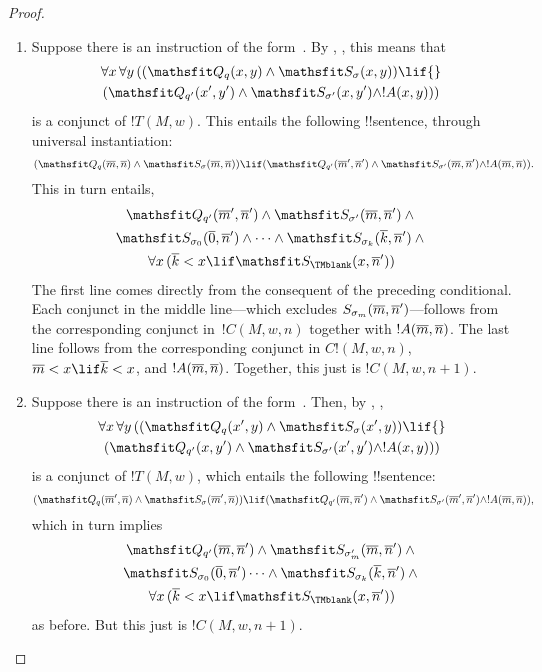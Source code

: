 \documentclass[../../../include/open-logic-section]{subfiles}
\begin{document}
\begin{proof}
\begin{enumerate} 
\item Suppose there is an instruction of the form~.
  By , , this means that
\begin{multline*} 
\lforall[x][\lforall[y][((\Obj Q_{q}(x,
    y) \land \Obj S_\sigma(x, y)) \lif {}]]\\
(\Obj Q_{q'}(x',
y') \land \Obj S_{\sigma'}(x, y') \land !A(x, y)))
\end{multline*} 
is a conjunct of $!T(M,w)$. This entails the following
!!{sentence}, through universal instantiation: 
\[ 
(\Obj Q_{q}(\num{m}, \num{n}) \land \Obj S_{\sigma}(\num{m}, \num{n}))
\lif (\Obj Q_{q'}(\num{m}', \num{n}') \land \Obj S_{\sigma'}(\num{m},
\num{n}') \land !A(\num{m}, \num{n})).
\]
This in turn entails,
\begin{multline*}
\Obj Q_{q'}(\num{m}', \num{n}') \land \Obj S_{\sigma'}(\num{m},
\num{n}') \land {}\\
\Obj S_{\sigma_0}(\num{0}, \num{n}') \land \dots \land
\Obj S_{\sigma_k}(\num{k}, \num{n}') \land {}\\
\lforall[x][(\num{k} < x
  \lif \Obj S_\TMblank(x, \num{n}'))]
\end{multline*}
The first line comes directly from the consequent of the preceding
conditional. Each conjunct in the middle line---which excludes
$S_{\sigma_m}(\overline{m},\overline{n}')$---follows from the corresponding
conjunct in~$!C(M, w, n)$ together with $!A(\overline{m}, \overline{n})$. The
last line follows from the corresponding conjunct in $C!(M, w, n)$,
$\num{m} < x \lif \num{k} < x$, and $!A(\overline{m}, \overline{n})$.  Together,
this just is $!C(M, w, n+1)$.

\item Suppose there is an instruction of the form~.
  Then, by , ,
\begin{multline*} 
\lforall[x][\lforall[y][((\Obj Q_{q}(x', y) \land \Obj
    S_{\sigma}(x', y)) \lif {}]]\\
(\Obj Q_{q'}(x, y') \land \Obj
S_{\sigma'}(x', y') \land !A(x, y)))
\end{multline*} 
is a conjunct of $!T(M,w)$, which entails the following !!{sentence}: 
\[ 
(\Obj Q_{q}(\num{m}', \num{n}) \land \Obj S_{\sigma}(\num{m}', \num{n}))
\lif (\Obj Q_{q'}(\num{m}, \num{n}') \land \Obj S_{\sigma'}(\num{m}',
\num{n}') \land !A(\num{m}, \num{n})),
\]
which in turn implies
\begin{multline*}
  \Obj Q_{q'}(\num{m}, \num{n}') \land \Obj S_{\sigma'_m}(\num{m},
  \num{n}') \land {}\\
  \Obj S_{\sigma_0}(\num{0}, \num{n}')\dots \land
  \Obj S_{\sigma_k}(\num{k}, \num{n}')  \land {} \\
  \lforall[x][(\num{k} < x
  \lif \Obj S_\TMblank(x, \num{n}'))]
\end{multline*}
as before. But this just is $!C(M, w, n+1)$.


\end{enumerate}
\end{proof}
\end{document}
